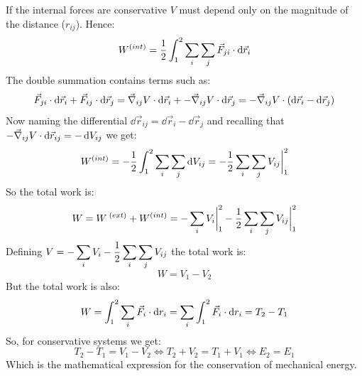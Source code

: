 If the internal forces are conservative $V$ must depend only on the magnitude of the distance ($r_{ij}$). Hence:
\begin{equation}
    W^{(int)}=\dfrac{1}{2}\int_{1}^{2}\displaystyle\sum_i\displaystyle\sum_j\vec{F}_{ji}\cdot\dd{\vec{r}_i}
\end{equation}
The double summation contains terms such as:
\begin{equation}
    \vec{F}_{ji}\cdot\dd{\vec{r}_i} + \vec{F}_{ij}\cdot\dd{\vec{r}_j} = \vec{\nabla}_{ij}V\cdot\dd{\vec{r}_i} + -\vec{\nabla}_{ij}V\cdot\dd{\vec{r}_j} = -\vec{\nabla}_{ij}V\cdot\left(\dd{\vec{r}_i}-\dd{\vec{r}_j}\right)
\end{equation}
Now naming the differential $\dd{\vec{r}_{ij}}=\dd{\vec{r}_i}-\dd{\vec{r}_j}$ and recalling that $-\vec{\nabla}_{ij}V\cdot\dd{\vec{r}_{ij}} = -\dd{V_{ij}}$ we get:
\begin{equation}
    W^{(int)}=-\dfrac{1}{2}\int_{1}^{2}\displaystyle\sum_i\displaystyle\sum_j\dd{V_{ij}} = -\dfrac{1}{2}\displaystyle\sum_i\displaystyle\sum_j V_{ij}\bigg|_{1}^{2}
\end{equation}
So the total work is:
\begin{equation}
    W = W^{\;(ext)}+W^{(int)}= -\displaystyle\sum_i V_i\bigg|_{1}^{2} -\dfrac{1}{2}\displaystyle\sum_i\displaystyle\sum_j V_{ij}\bigg|_{1}^{2}
\end{equation}
Defining $V=-\displaystyle\sum_i V_i -\dfrac{1}{2}\displaystyle\sum_i\displaystyle\sum_j V_{ij}$ the total work is:
\begin{equation}
    W = V_1-V_2
\end{equation}
But the total work is also:
\begin{equation}
    W = \int_{1}^{2}\displaystyle\sum_i \vec{F}_i \cdot \dd{r_i}= \displaystyle\sum_i \int_{1}^{2} \vec{F}_i \cdot \dd{r_i} = T_2 - T_1
\end{equation}
So, for conservative systems we get:
\begin{equation}
    T_2 - T_1 = V_1 - V_2 \iff T_2 + V_2 = T_1 + V_1 \iff E_2 = E_1
\end{equation}
Which is the mathematical expression for the conservation of mechanical energy.
